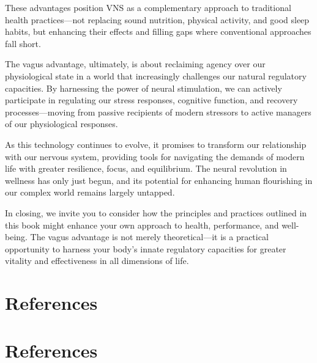 \documentclass[
  Letterpaper,
]{scrbook}
\begin{document}
These advantages position VNS as a complementary approach to traditional
health practices---not replacing sound nutrition, physical activity, and
good sleep habits, but enhancing their effects and filling gaps where
conventional approaches fall short.

The vagus advantage, ultimately, is about reclaiming agency over our
physiological state in a world that increasingly challenges our natural
regulatory capacities. By harnessing the power of neural stimulation, we
can actively participate in regulating our stress responses, cognitive
function, and recovery processes---moving from passive recipients of
modern stressors to active managers of our physiological responses.

As this technology continues to evolve, it promises to transform our
relationship with our nervous system, providing tools for navigating the
demands of modern life with greater resilience, focus, and equilibrium.
The neural revolution in wellness has only just begun, and its potential
for enhancing human flourishing in our complex world remains largely
untapped.

In closing, we invite you to consider how the principles and practices
outlined in this book might enhance your own approach to health,
performance, and well-being. The vagus advantage is not merely
theoretical---it is a practical opportunity to harness your body's
innate regulatory capacities for greater vitality and effectiveness in
all dimensions of life.


\chapter{References}\label{references}


\chapter*{References}\label{references-1}

\end{document}
